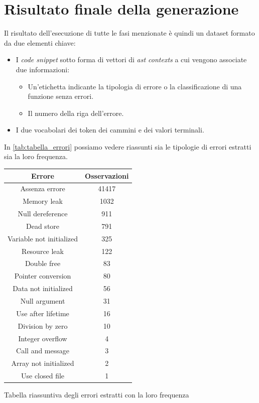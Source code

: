 \section{Risultato finale della generazione}
Il risultato dell'esecuzione di tutte le fasi menzionate è quindi un dataset formato da due elementi chiave:
    \begin{itemize}
        \item I \textit{code snippet} sotto forma di vettori di \textit{ast contexts} a cui vengono associate due informazioni:
        \begin{itemize}
            \item Un'etichetta indicante la tipologia di errore o la classificazione di una funzione senza errori.
            \item Il numero della riga dell'errore.
        \end{itemize}
        \item I due vocabolari dei token dei cammini e dei valori terminali.
    \end{itemize}
In \autoref{tab:tabella_errori} possiamo vedere riassunti sia le tipologie di errori estratti sia la loro frequenza.
    \begin{center}
      \begin{tabular}{|c|c|}
        \hline
        Errore & Osservazioni \\
        \hline
        Assenza errore & 41417 \\
        \hline
        Memory leak & 1032 \\
        \hline
        Null dereference & 911 \\
        \hline
        Dead store & 791 \\
        \hline
        Variable not initialized & 325 \\
        \hline
        Resource leak & 122 \\
        \hline
        Double free & 83 \\
        \hline
        Pointer conversion & 80 \\
        \hline
        Data not initialized & 56 \\
        \hline
        Null argument & 31 \\
        \hline
        Use after lifetime & 16 \\
        \hline
        Division by zero & 10 \\
        \hline
        Integer overflow & 4 \\
        \hline
        Call and message & 3 \\
        \hline
        Array not initialized & 2 \\
        \hline
        Use closed file & 1 \\
        \hline
      \end{tabular}
      \caption{Tabella riassuntiva degli errori estratti con la loro frequenza}
      \label{tab:tabella_errori}
    \end{center}


